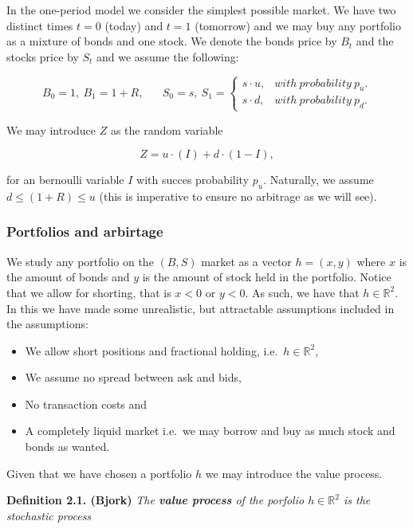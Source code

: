 \documentclass[
]{book}
\providecommand{\tightlist}{%
  \setlength{\itemsep}{0pt}\setlength{\parskip}{0pt}}
\begin{document}
In the one-period model we consider the simplest possible market. We have two distinct times \(t=0\) (today) and \(t=1\) (tomorrow) and we may buy any portfolio as a mixture of bonds and one stock. We denote the bonds price by \(B_t\) and the stocks price by \(S_t\) and we assume the following:

\[
B_0=1,\ B_1=1+R,\hspace{20pt}S_0=s,\ S_1=\left\{\begin{matrix}s\cdot u, & with\ probability\ p_u.\\s\cdot d, & with\ probability\ p_d.\end{matrix}\right.
\]

We may introduce \(Z\) as the random variable

\[
Z=u\cdot (I)+d\cdot (1-I),
\]

for an bernoulli variable \(I\) with succes probability \(p_u\). Naturally, we assume \(d\le (1+R)\le u\) (this is imperative to ensure no arbitrage as we will see).

\hypertarget{portfolios-and-arbirtage}{%
\subsubsection{Portfolios and arbirtage}\label{portfolios-and-arbirtage}}

We study any portfolio on the \((B,S)\) market as a vector \(h=(x,y)\) where \(x\) is the amount of bonds and \(y\) is the amount of stock held in the portfolio. Notice that we allow for shorting, that is \(x<0\) or \(y<0\). As such, we have that \(h\in \mathbb{R}^2\). In this we have made some unrealistic, but attractable assumptions included in the assumptions:

\begin{itemize}
\tightlist
\item
  We allow short positions and fractional holding, i.e.~\(h\in \mathbb{R}^2\),
\item
  We assume no spread between ask and bids,
\item
  No transaction costs and
\item
  A completely liquid market i.e.~we may borrow and buy as much stock and bonds as wanted.
\end{itemize}

Given that we have chosen a portfolio \(h\) we may introduce the value process.

\textbf{Definition 2.1. (Bjork)} \emph{The \textbf{value process} of the porfolio \(h\in\mathbb{R}^2\) is the stochastic process}
\end{document}
